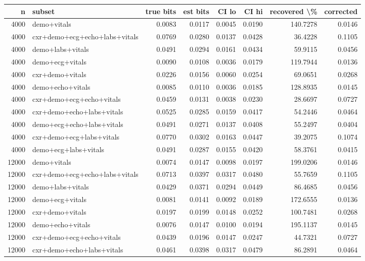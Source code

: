 \begin{tabular}{rlrrrrrr}
\toprule
\textbf{n} & \textbf{subset} & \textbf{true bits} & \textbf{est bits} & \textbf{CI lo} & \textbf{CI hi} & \textbf{recovered \textbackslash{}\%} & \textbf{corrected} \\
\midrule
4000 & demo+vitals & 0.0083 & 0.0117 & 0.0045 & 0.0190 & 140.7278 & 0.0146 \\
4000 & cxr+demo+ecg+echo+labs+vitals & 0.0769 & 0.0280 & 0.0137 & 0.0428 & 36.4228 & 0.1105 \\
4000 & demo+labs+vitals & 0.0491 & 0.0294 & 0.0161 & 0.0434 & 59.9115 & 0.0456 \\
4000 & demo+ecg+vitals & 0.0090 & 0.0108 & 0.0036 & 0.0179 & 119.7944 & 0.0136 \\
4000 & cxr+demo+vitals & 0.0226 & 0.0156 & 0.0060 & 0.0254 & 69.0651 & 0.0268 \\
4000 & demo+echo+vitals & 0.0085 & 0.0110 & 0.0036 & 0.0185 & 128.8935 & 0.0145 \\
4000 & cxr+demo+ecg+echo+vitals & 0.0459 & 0.0131 & 0.0038 & 0.0230 & 28.6697 & 0.0727 \\
4000 & cxr+demo+echo+labs+vitals & 0.0525 & 0.0285 & 0.0159 & 0.0417 & 54.2446 & 0.0464 \\
4000 & demo+ecg+echo+labs+vitals & 0.0491 & 0.0271 & 0.0137 & 0.0408 & 55.2497 & 0.0404 \\
4000 & cxr+demo+ecg+labs+vitals & 0.0770 & 0.0302 & 0.0163 & 0.0447 & 39.2075 & 0.1074 \\
4000 & demo+ecg+labs+vitals & 0.0491 & 0.0287 & 0.0155 & 0.0420 & 58.3761 & 0.0415 \\
12000 & demo+vitals & 0.0074 & 0.0147 & 0.0098 & 0.0197 & 199.0206 & 0.0146 \\
12000 & cxr+demo+ecg+echo+labs+vitals & 0.0713 & 0.0397 & 0.0317 & 0.0480 & 55.7659 & 0.1105 \\
12000 & demo+labs+vitals & 0.0429 & 0.0371 & 0.0294 & 0.0449 & 86.4685 & 0.0456 \\
12000 & demo+ecg+vitals & 0.0081 & 0.0141 & 0.0092 & 0.0189 & 172.6555 & 0.0136 \\
12000 & cxr+demo+vitals & 0.0197 & 0.0199 & 0.0148 & 0.0252 & 100.7481 & 0.0268 \\
12000 & demo+echo+vitals & 0.0076 & 0.0147 & 0.0100 & 0.0194 & 195.1137 & 0.0145 \\
12000 & cxr+demo+ecg+echo+vitals & 0.0439 & 0.0196 & 0.0147 & 0.0247 & 44.7321 & 0.0727 \\
12000 & cxr+demo+echo+labs+vitals & 0.0461 & 0.0398 & 0.0317 & 0.0479 & 86.2891 & 0.0464 \\

\end{tabular}
